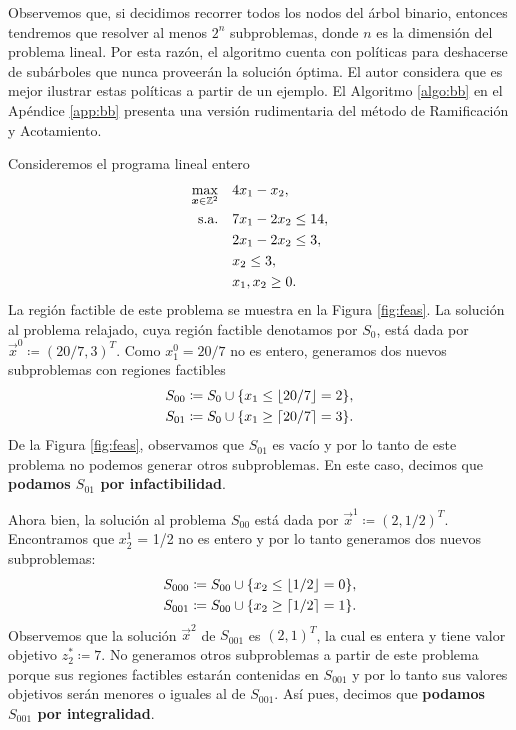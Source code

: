 Observemos que, si decidimos recorrer todos los nodos del árbol binario, entonces tendremos que
resolver al menos $2^n$ subproblemas, donde $n$ es la dimensión del problema lineal. Por esta razón,
el algoritmo cuenta con políticas para deshacerse de subárboles que nunca proveerán la solución
óptima. El autor considera que es mejor ilustrar estas políticas a partir de un ejemplo. El
Algoritmo \ref{algo:bb} en el Apéndice \ref{app:bb} presenta una versión rudimentaria del método de
Ramificación y Acotamiento.

\begin{example}
	\label{ex:ilp}
	Consideremos el programa lineal entero
	\begin{align*}
		\max_{\boldsymbol{x} \in \mathbb{Z}^2} \quad
			& 4x_1 - x_2, \\
			\text{s.a.} \quad
			& 7x_1 - 2x_2 \leq 14, \\
			& 2x_1 - 2x_2 \leq 3, \\
			& x_2 \leq 3, \\
			& x_1, x_2 \geq 0.
	\end{align*}
	La región factible de este problema se muestra en la Figura \ref{fig:feas}. La solución al problema
	relajado, cuya región factible denotamos por $S_0$, está dada por $\vec{x}^0 \coloneq (20/7,
	3)^T$. Como $x_1^0 = 20/7$ no es entero, generamos dos nuevos subproblemas con regiones
	factibles
	\begin{align*}
		S_{00} &\coloneq S_0 \cup \lbrace  x_1 \leq \left\lfloor 20/7 \right\rfloor = 2 \rbrace, \\
		S_{01} &\coloneq S_0 \cup \lbrace  x_1 \geq \left\lceil 20/7 \right\rceil = 3 \rbrace.
	\end{align*}
	De la Figura \ref{fig:feas}, observamos que $S_{01}$ es vacío y por lo tanto de este problema no
	podemos generar otros subproblemas. En este caso, decimos que \textbf{podamos $S_{01}$ por
	infactibilidad}.

	Ahora bien, la solución al problema $S_{00}$ está dada por $\vec{x}^1 \coloneq (2, 1/2)^T$.
	Encontramos que $x_2^1$ = 1/2 no es entero y por lo tanto generamos dos nuevos subproblemas:
	\begin{align*}
		S_{000} &\coloneq S_{00} \cup \lbrace  x_2 \leq \left\lfloor 1/2 \right\rfloor = 0 \rbrace, \\
		S_{001} &\coloneq S_{00} \cup \lbrace  x_2 \geq \left\lceil 1/2 \right\rceil = 1 \rbrace.
	\end{align*}
	Observemos que la solución $\vec{x}^2$ de $S_{001}$ es $(2, 1)^T$, la cual es entera y tiene valor
	objetivo $z_2^* \coloneq 7$. No generamos otros subproblemas a partir de este problema porque
	sus regiones factibles estarán contenidas en $S_{001}$ y por lo tanto sus valores objetivos
	serán menores o iguales al de $S_{001}$. Así pues, decimos que \textbf{podamos $S_{001}$ por
	integralidad}.


\end{example}
